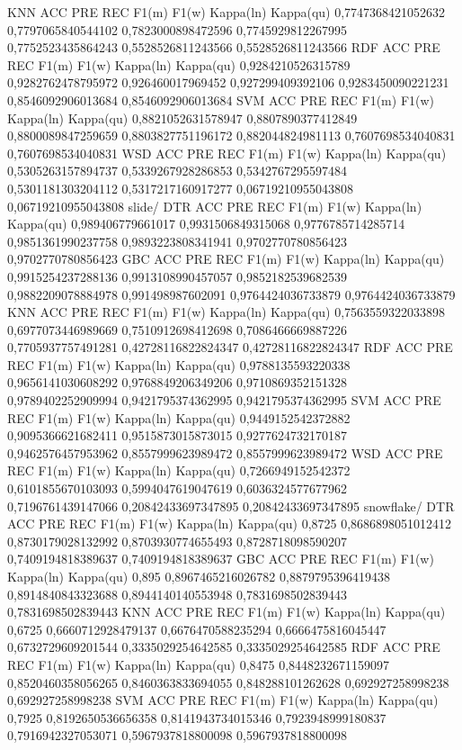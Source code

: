 KNN
ACC	PRE	REC	F1(m)	F1(w)	Kappa(ln)	Kappa(qu)
0,7747368421052632	0,7797065840544102	0,7823000898472596	0,7745929812267995	0,7752523435864243	0,5528526811243566	0,5528526811243566
RDF
ACC	PRE	REC	F1(m)	F1(w)	Kappa(ln)	Kappa(qu)
0,9284210526315789	0,9282762478795972	0,926460017969452	0,927299409392106	0,9283450090221231	0,8546092906013684	0,8546092906013684
SVM
ACC	PRE	REC	F1(m)	F1(w)	Kappa(ln)	Kappa(qu)
0,8821052631578947	0,8807890377412849	0,8800089847259659	0,8803827751196172	0,882044824981113	0,7607698534040831	0,7607698534040831
WSD
ACC	PRE	REC	F1(m)	F1(w)	Kappa(ln)	Kappa(qu)
0,5305263157894737	0,5339267928286853	0,5342767295597484	0,5301181303204112	0,5317217160917277	0,06719210955043808	0,06719210955043808
slide/
DTR
ACC	PRE	REC	F1(m)	F1(w)	Kappa(ln)	Kappa(qu)
0,989406779661017	0,9931506849315068	0,9776785714285714	0,9851361990237758	0,9893223808341941	0,9702770780856423	0,9702770780856423
GBC
ACC	PRE	REC	F1(m)	F1(w)	Kappa(ln)	Kappa(qu)
0,9915254237288136	0,9913108990457057	0,9852182539682539	0,9882209078884978	0,991498987602091	0,9764424036733879	0,9764424036733879
KNN
ACC	PRE	REC	F1(m)	F1(w)	Kappa(ln)	Kappa(qu)
0,7563559322033898	0,6977073446989669	0,7510912698412698	0,7086466669887226	0,7705937757491281	0,42728116822824347	0,42728116822824347
RDF
ACC	PRE	REC	F1(m)	F1(w)	Kappa(ln)	Kappa(qu)
0,9788135593220338	0,9656141030608292	0,9768849206349206	0,9710869352151328	0,9789402252909994	0,9421795374362995	0,9421795374362995
SVM
ACC	PRE	REC	F1(m)	F1(w)	Kappa(ln)	Kappa(qu)
0,9449152542372882	0,9095366621682411	0,9515873015873015	0,9277624732170187	0,9462576457953962	0,8557999623989472	0,8557999623989472
WSD
ACC	PRE	REC	F1(m)	F1(w)	Kappa(ln)	Kappa(qu)
0,7266949152542372	0,6101855670103093	0,5994047619047619	0,6036324577677962	0,7196761439147066	0,20842433697347895	0,20842433697347895
snowflake/
DTR
ACC	PRE	REC	F1(m)	F1(w)	Kappa(ln)	Kappa(qu)
0,8725	0,8686898051012412	0,8730179028132992	0,8703930774655493	0,8728718098590207	0,7409194818389637	0,7409194818389637
GBC
ACC	PRE	REC	F1(m)	F1(w)	Kappa(ln)	Kappa(qu)
0,895	0,8967465216026782	0,8879795396419438	0,8914840843323688	0,8944140140553948	0,7831698502839443	0,7831698502839443
KNN
ACC	PRE	REC	F1(m)	F1(w)	Kappa(ln)	Kappa(qu)
0,6725	0,6660712928479137	0,6676470588235294	0,6666475816045447	0,6732729609201544	0,3335029254642585	0,3335029254642585
RDF
ACC	PRE	REC	F1(m)	F1(w)	Kappa(ln)	Kappa(qu)
0,8475	0,8448232671159097	0,8520460358056265	0,8460363833694055	0,848288101262628	0,692927258998238	0,692927258998238
SVM
ACC	PRE	REC	F1(m)	F1(w)	Kappa(ln)	Kappa(qu)
0,7925	0,8192650536656358	0,8141943734015346	0,7923948999180837	0,7916942327053071	0,5967937818800098	0,5967937818800098
